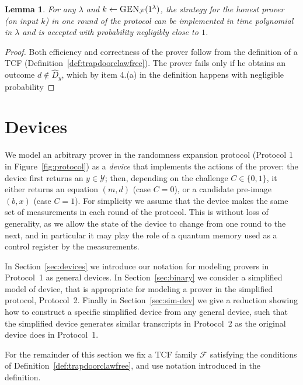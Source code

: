 \documentclass[11pt]{article}
\newtheorem{lemma}[theorem]{Lemma}
\theoremstyle{remark}
\theoremstyle{definition}
\newcommand{\mY}{\ensuremath{\mathcal{Y}}}
\newcommand{\GEN}{\ensuremath{\textsc{GEN}}}
\begin{document}
\begin{lemma}\label{lem:completeness}
For any $\lambda$ and $k\leftarrow\GEN_{\mathcal{F}}(1^\lambda)$, the strategy for the honest prover (on input $k$) in one round of the protocol can be implemented in time polynomial in $\lambda$ and is accepted with probability negligibly close to $1$.  
\end{lemma}

\begin{proof}
Both efficiency and correctness of the prover follow from the definition of a TCF (Definition~\ref{def:trapdoorclawfree}). The prover fails only if he obtains an outcome $d\notin \hat{D}_y$, which by item 4.(a) in the definition happens with negligible probability
\end{proof}


\section{Devices}

We model an arbitrary prover in the randomness expansion protocol (Protocol 1 in Figure~\ref{fig:protocol}) as a \emph{device} that implements the actions of the prover: the device first returns an $y\in\mY$; then, depending on the challenge $C\in\{0,1\}$, it either returns an equation $(m,d)$ (case $C=0$), or a candidate pre-image $(b,x)$ (case $C=1$). For simplicity we assume that the device makes the same set of measurements in each round of the protocol. This is without loss of generality, as we allow the state of the device to change from one round to the next, and in particular it may play the role of a quantum memory used as a control register by the measurements. 

In Section~\ref{sec:devices} we introduce our notation for modeling provers in Protocol~1 as general devices. In Section~\ref{sec:binary} we consider a simplified model of device, that is appropriate for modeling a prover in the simplified protocol, Protocol~2. Finally in Section~\ref{sec:sim-dev} we give a reduction showing how to construct a specific simplified device from any general device, such that the simplified device generates similar transcripts in Protocol~2 as the original device does in Protocol~1. 

For the remainder of this section we fix a TCF family $\mathcal{F}$ satisfying the conditions of Definition~\ref{def:trapdoorclawfree}, and use notation introduced in the definition. 
\end{document}

